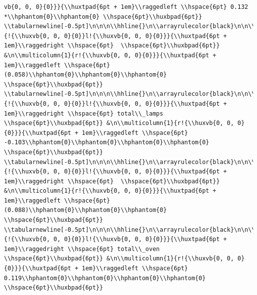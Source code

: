\documentclass[11pt,preprint, authoryear]{elsarticle}
\numberwithin{equation}{section}
\numberwithin{figure}{section}
\numberwithin{table}{section}
\begin{document}
\begin{verbatim}
vb{0, 0, 0}{0}}}{\\huxtpad{6pt + 1em}\\raggedleft \\hspace{6pt} 0.132 *\\hphantom{0}\\hphantom{0} \\hspace{6pt}\\huxbpad{6pt}} \\tabularnewline[-0.5pt]\n\n\n\\hhline{}\n\\arrayrulecolor{black}\n\n\\multicolumn{1}{!{\\huxvb{0, 0, 0}{0}}l!{\\huxvb{0, 0, 0}{0}}}{\\huxtpad{6pt + 1em}\\raggedright \\hspace{6pt}  \\hspace{6pt}\\huxbpad{6pt}} &\n\\multicolumn{1}{r!{\\huxvb{0, 0, 0}{0}}}{\\huxtpad{6pt + 1em}\\raggedleft \\hspace{6pt} (0.058)\\hphantom{0}\\hphantom{0}\\hphantom{0} \\hspace{6pt}\\huxbpad{6pt}} \\tabularnewline[-0.5pt]\n\n\n\\hhline{}\n\\arrayrulecolor{black}\n\n\\multicolumn{1}{!{\\huxvb{0, 0, 0}{0}}l!{\\huxvb{0, 0, 0}{0}}}{\\huxtpad{6pt + 1em}\\raggedright \\hspace{6pt} total\\_lamps \\hspace{6pt}\\huxbpad{6pt}} &\n\\multicolumn{1}{r!{\\huxvb{0, 0, 0}{0}}}{\\huxtpad{6pt + 1em}\\raggedleft \\hspace{6pt} -0.103\\hphantom{0}\\hphantom{0}\\hphantom{0}\\hphantom{0} \\hspace{6pt}\\huxbpad{6pt}} \\tabularnewline[-0.5pt]\n\n\n\\hhline{}\n\\arrayrulecolor{black}\n\n\\multicolumn{1}{!{\\huxvb{0, 0, 0}{0}}l!{\\huxvb{0, 0, 0}{0}}}{\\huxtpad{6pt + 1em}\\raggedright \\hspace{6pt}  \\hspace{6pt}\\huxbpad{6pt}} &\n\\multicolumn{1}{r!{\\huxvb{0, 0, 0}{0}}}{\\huxtpad{6pt + 1em}\\raggedleft \\hspace{6pt} (0.088)\\hphantom{0}\\hphantom{0}\\hphantom{0} \\hspace{6pt}\\huxbpad{6pt}} \\tabularnewline[-0.5pt]\n\n\n\\hhline{}\n\\arrayrulecolor{black}\n\n\\multicolumn{1}{!{\\huxvb{0, 0, 0}{0}}l!{\\huxvb{0, 0, 0}{0}}}{\\huxtpad{6pt + 1em}\\raggedright \\hspace{6pt} total\\_oven \\hspace{6pt}\\huxbpad{6pt}} &\n\\multicolumn{1}{r!{\\huxvb{0, 0, 0}{0}}}{\\huxtpad{6pt + 1em}\\raggedleft \\hspace{6pt} 0.119\\hphantom{0}\\hphantom{0}\\hphantom{0}\\hphantom{0} \\hspace{6pt}\\huxbpad{6pt}} 
\end{verbatim}
\end{document}

